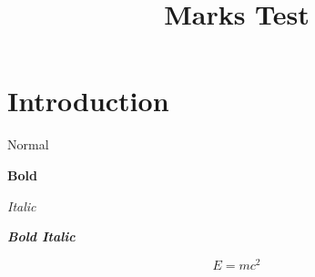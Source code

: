 \documentclass[conference]{IEEEtran}
\begin{document}
\title{Marks Test}
\author{}
\maketitle
\section{Introduction}
Normal

\textbf{Bold}

\textit{Italic}

\textbf{\textit{Bold Italic}}

\begin{equation}
E = mc^{2}
\end{equation}
\end{document}
